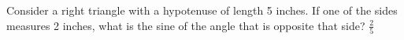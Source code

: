 {Consider a right triangle with a hypotenuse of length 5 inches. If one of the sides measures 2 inches, what is the sine of the angle that is opposite that side?}
{$\frac{2}{5}$}
